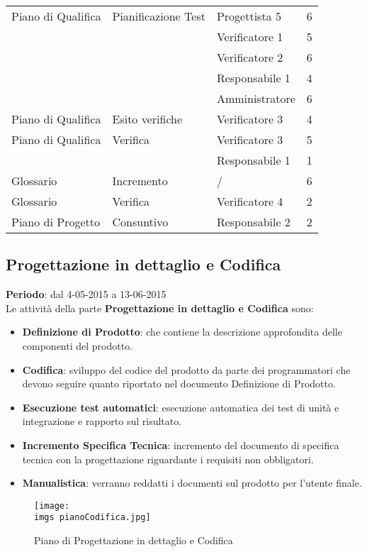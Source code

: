 {{\begin{longtable} [c]{| l | l | l | l |}
		Piano di Qualifica & Pianificazione Test & Progettista 5 & 6\\
		&	&	Verificatore 1 & 5\\
		&	&	Verificatore 2 & 6\\
		&	&	Responsabile 1 & 4\\
		&	&	Amministratore & 6\\
		Piano di Qualifica & Esito verifiche & Verificatore 3 & 4 \\
		Piano di Qualifica & Verifica & Verificatore 3 & 5\\
		&	&	Responsabile 1 & 1\\
		Glossario & Incremento & / & 6 \\
		Glossario & Verifica & Verificatore 4 & 2 \\
		Piano di Progetto & Consuntivo & Responsabile 2 & 2\\
	\end{longtable}
}
\subsection{Progettazione in dettaglio e Codifica}{
	\textbf{Periodo}: dal 4-05-2015 a 13-06-2015 \\
	 
	 Le attivit\`{a} della parte \textbf{Progettazione in dettaglio e Codifica} sono:
	 \begin{itemize}
		 \item \textbf{Definizione di Prodotto}: che contiene la descrizione approfondita delle componenti del prodotto.
		 \item \textbf{Codifica}: sviluppo del codice del prodotto da parte dei programmatori che devono seguire quanto riportato nel documento Definizione di Prodotto.
		 \item \textbf{Esecuzione test automatici}: esecuzione automatica dei test di unit\`{a} e integrazione e rapporto sul risultato.
		 \item \textbf{Incremento Specifica Tecnica}: incremento del documento di specifica tecnica con la progettazione riguardante i requisiti non obbligatori.
		 \item \textbf{Manualistica}: verranno reddatti i documenti sul prodotto per l'utente finale.
	 \end{itemize}
	
	\begin{figure}[H]
		\texttt{[image: \\imgs pianoCodifica.jpg]}
		\label{fig:pianoprogettazdettcodifica}
		\caption{Piano di Progettazione in dettaglio e Codifica}
	\end{figure}
	
}}
